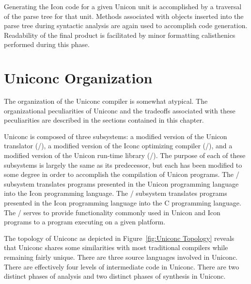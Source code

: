 Generating the Icon code for a given Unicon unit is accomplished by a
traversal of the parse tree for that unit. Methods associated with
objects inserted into the parse tree during syntactic analysis are
again used to accomplish code generation. Readability of the final
product is facilitated by minor formatting calisthenics performed
during this phase.

\section{Uniconc Organization}

The organization of the Uniconc compiler is somewhat atypical. The
organizational peculiarities of Uniconc and the tradeoffs associated
with these peculiarities are described in the sections contained in
this chapter.

Uniconc is composed of three subsystems: a modified version of the
Unicon translator (\Ut/), a modified version of the Iconc optimizing
compiler (\Ic/), and a modified version of the Unicon \mbox{run-time}
library (\Rtl/). The purpose of each of these subsystems is largely
the same as its predecessor, but each has been modified to some degree
in order to accomplish the compilation of Unicon programs. The \Ut/
subsystem translates programs presented in the Unicon programming
language into the Icon programming language. The \Ic/ subsystem
translates programs presented in the Icon programming language into
the C programming language. The \Rtl/ serves to provide functionality
commonly used in Unicon and Icon programs to a program executing on a
given platform.

The topology of Uniconc as depicted in Figure~\ref{fig:Uniconc Topology}
reveals that Uniconc shares some similarities with most traditional
compilers while remaining fairly unique. There are three source
languages involved in Uniconc. There are effectively four levels of
intermediate code in Uniconc. There are two distinct phases of
analysis and two distinct phases of synthesis in Uniconc.

